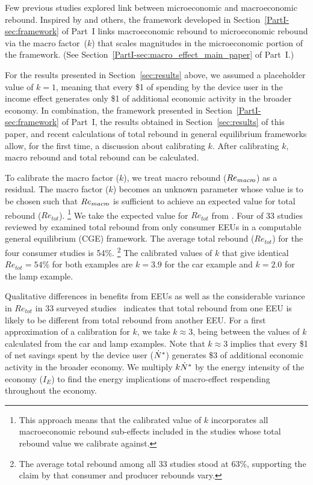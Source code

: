 \documentclass[12pt]{article}\usepackage[]{graphicx}\usepackage[]{xcolor}
\begin{document}
Few previous studies explored link 
between microeconomic and macroeconomic rebound.
Inspired by \citet{Borenstein:2015aa} and others, 
the framework developed in Section~\ref{PartI-sec:framework} of Part~I
links macroeconomic rebound to microeconomic rebound 
via the macro factor~($k$) that scales
magnitudes in the microeconomic portion of the framework. 
(See Section~\ref{PartI-sec:macro_effect_main_paper} of Part~I.)

For the results presented in Section~\ref{sec:results} above, 
we assumed a placeholder value of $k = 1$,
meaning that every \$1 of spending by the device user in the income effect
generates only \$1 of additional economic activity in the broader economy.
In combination, the framework presented in Section~\ref{PartI-sec:framework} of Part~I, 
the results obtained in Section~\ref{sec:results} of this paper, and
recent calculations of total rebound in general equilibrium frameworks allow, 
for the first time, 
a discussion about calibrating $k$.
After calibrating $k$, 
macro rebound and total rebound can be calculated.

To calibrate the macro factor ($k$),
we treat macro rebound ($Re_{macr\!o}$) as a residual.
The macro factor ($k$) becomes an unknown parameter whose value is to be chosen
such that $Re_{macr\!o}$
is sufficient to achieve an expected value for total rebound ($Re_{tot}$).%
\footnote{
  This approach means that the calibrated value of $k$ incorporates all 
  macroeconomic rebound sub-effects included in the studies
  whose total rebound value we calibrate against.
}
%
We take the expected value for $Re_{tot}$ from 
\citet{Brockway:2021ww}.
Four of 33 studies reviewed by \citet{Brockway:2021ww}
examined total rebound from only consumer EEUs in a computable general
equilibrium (CGE) framework. 
The average total rebound ($Re_{tot}$) 
for the four consumer studies is 54\%.%
\footnote{
  The average total rebound among all 33 studies stood at 63\%,
  supporting the claim by \citet{Turner:2013aa} that consumer
  and producer rebounds vary.
}
%
The calibrated values of $k$ that give identical 
$Re_{tot} = 54$\% 
for both examples are
$k = 3.9$
for the car example and
$k = 2.0$ 
for the lamp example.

Qualitative differences in benefits from EEUs as well as the considerable 
variance in $Re_{tot}$ in 33 surveyed studies~\citep{Brockway:2021ww}
indicates that total rebound from one EEU is likely to be different from 
total rebound from another EEU. 
For a first approximation of a calibration for $k$,
we take $k \approx 3$,
being between the values of $k$ 
calculated from the car and lamp examples.
Note that $k \approx 3$ implies that 
every \$1 of net savings spent by the device user (${\dot{N}}^*$)
generates \$3 of additional economic 
activity in the broader economy.
We multiply $k {\dot{N}}^*$ by the energy intensity of the economy ($I_E$) to 
find the energy implications of macro-effect respending throughout the economy.
\end{document}
